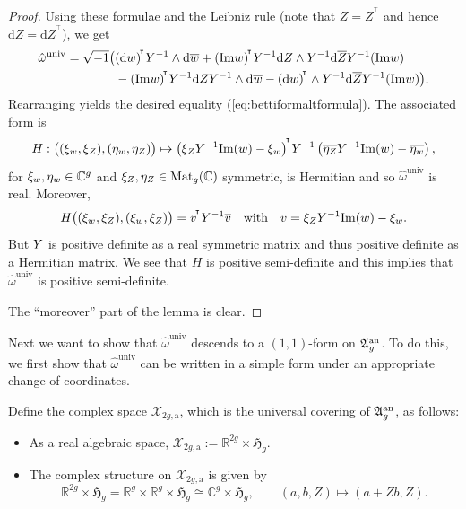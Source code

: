 \begin{proof}
Using these formulae  
and the Leibniz rule (note that $Z = Z^{\!^{\intercal}}$ and hence $\mathrm{d}Z = \mathrm{d}Z^{\!^{\intercal}}$), we get
\begin{align*}
    \hat\omega^{\mathrm{univ}} = \sqrt{-1} \big( &
 (\mathrm{d}w)^{\!^{\intercal}} Y^{-1} \wedge  \mathrm{d}\overline{w} + (\mathrm{Im}w)^{\!^{\intercal}} Y^{-1}  \mathrm{d}Z \wedge Y^{-1}  \mathrm{d}\overline{Z}  Y^{-1} (\mathrm{Im}w) \\
 & - (\mathrm{Im}w)^{\!^{\intercal}} Y^{-1} \mathrm{d}Z
 Y^{-1} \wedge  \mathrm{d}\overline{w} -
 (\mathrm{d}w)^{\!^{\intercal}}   \wedge Y^{-1}  \mathrm{d}\overline{Z} Y^{-1} (\mathrm{Im}w) \big). 
\end{align*}
  Rearranging yields the desired equality (\ref{eq:bettiformaltformula}). 
  The associated  form is 
  \begin{equation*}
    H:\bigl((\xi_w,\xi_Z),(\eta_w,\eta_Z)\bigr) \mapsto 
    {{\left( \xi_Z Y^{-1}
        \mathrm{Im}(w) - \xi_w\right)}}^{\!^{\intercal}}  Y^{-1} \left( \overline{\eta_Z} Y^{-1}
      \mathrm{Im}(w) -  \overline{\eta_w}\right),
  \end{equation*}
  for $\xi_w,\eta_w \in {\mathbb{C}}^g$ and $\xi_Z,\eta_Z\in
  \mathrm{Mat}_g({\mathbb{C}})$ symmetric, is Hermitian and so
  $\hat \omega^{\mathrm{univ}}$ is real. Moreover, 
    \begin{equation*}
    H\bigl((\xi_w,\xi_Z),(\xi_w,\xi_Z)\bigr) = {{v}}^{\!^{\intercal}} Y^{-1} \overline v
    \quad\text{with}\quad v =  \xi_Z Y^{-1}
        \mathrm{Im}(w) - \xi_w.
  \end{equation*}
  But $Y$ is positive definite as a real symmetric matrix and thus
  positive definite as a Hermitian matrix. We see that $H$
  is positive semi-definite and this implies that
  $\hat\omega^{\mathrm{univ}}$ is positive semi-definite.

  The ``moreover'' part of the lemma is clear.    
\end{proof}

Next we want to show that $\hat{\omega}^{\mathrm{univ}}$ descends to a $(1,1)$-form on ${\mathfrak{A}}^{\mathrm{an}}_g$. To do this, we first show that $\hat{\omega}^{\mathrm{univ}}$ can be written in a simple form under an appropriate change of coordinates.

Define the complex space $\mathcal X_{2g,\mathrm{a}}$, which is the universal covering of ${\mathfrak{A}}^{\mathrm{an}}_g$, as follows:
\begin{itemize}
\item As a real algebraic space, $\mathcal X_{2g,\mathrm{a}} := \mathbb R^{2g} \times \mathfrak{H}_g$.
\item The complex structure on $\mathcal X_{2g,\mathrm{a}}$ is given by
\begin{equation}\label{EqChangeOfCoor}
\mathbb R^{2g} \times \mathfrak{H}_g = \mathbb R^g \times \mathbb R^g \times \mathfrak{H}_g \cong \mathbb C^g \times \mathfrak{H}_g, \qquad (a,b,Z) \mapsto (a+Zb, Z).
\end{equation}
\end{itemize}


